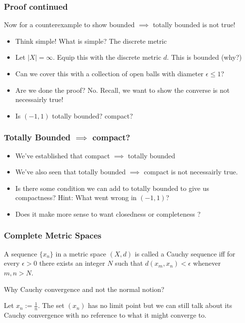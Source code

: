 \documentclass[compress, red]{beamer}
\begin{document}
    \begin{frame}
        \frametitle{Proof continued}
        Now for a counterexample to show bounded $\implies$ totally bounded is not true!
        \begin{itemize}
            \item<2-> Think simple! What is simple? The discrete metric
            \item<3-> Let $|X| = \infty$. Equip this with the discrete metric $d$. This is bounded (why?)
            \item<4-> Can we cover this with a collection of open balls with diameter $\epsilon \leq 1$?
            \item<5-> Are we done the proof? No. Recall, we want to show the converse is not \alert{necessairly} true!
            \item<6-> Is $(-1,1)$ totally bounded? compact?
        \end{itemize}
    \end{frame}

    \begin{frame}
        \frametitle{Totally Bounded $\implies$ compact?}
        \begin{itemize}
            \item<2-> We've established that compact $\implies$ totally bounded
            \item<3-> We've also seen that totally bounded $\implies$ compact is not necessairly true.
            \item<4-> Is there some condition we can add to totally bounded to give us compactness? Hint: What went wrong in $(-1,1)$?
            \item<5-> Does it make more sense to want closedness or  completeness ?
        \end{itemize}
    \end{frame}

    \begin{frame}
        \frametitle{Complete Metric Spaces}
        \begin{definition}
            A sequence $\{x_n\}$ in a metric space $(X,d)$ is called a \alert{Cauchy sequence} iff for every $\epsilon>0$ there exists
            an integer $N$ such that $d(x_m,x_n)<\epsilon$ whenever $m,n>N$.
        \end{definition}
        Why Cauchy convergence and not the normal notion?
        \begin{example}
            Let $x_n := \frac{1}{n}$. The set $(x_n)$ has no limit point but we can still talk about its \alert{Cauchy} convergence
            with no reference to what it might converge to. 
        \end{example}
    \end{frame}
\end{document}
